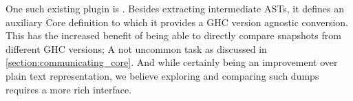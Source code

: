 One such existing plugin is  \cite{ghc_dump}. Besides extracting intermediate ASTs, it defines an
auxiliary Core definition to which it provides a GHC version agnostic conversion. This has the increased benefit of 
being able to directly compare snapshots from different GHC versions; A not uncommon task as discussed in \cref{section:communicating_core}.
And while certainly being an improvement over plain text representation, we believe exploring and comparing such
dumps requires a more rich interface.

